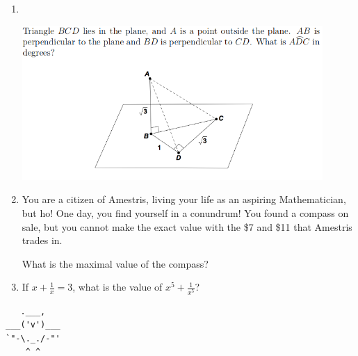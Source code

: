 \documentclass{article}
\begin{document}
\begin{enumerate}[1.]
\item %
~
\begin{center}
    \includegraphics[width=0.9\textwidth]{test_1_question_3}
\end{center}
\vspace{6.81mm}

\item %
You are a citizen of Amestris, living your life as an aspiring Mathematician, but ho! One day, you find yourself in a conundrum! You found a compass on sale, but you cannot make the exact value with the \$7 and \$11 that Amestris trades in. 

What is the maximal value of the compass?
\vspace{6.81mm}

\item %
If $x + \frac{1}{x} = 3$, what is the value of $x^5 + \frac{1}{x^5}$?\\

\end{enumerate}


\vfill
\begin{center} \begin{BVerbatim}
   .___,   
___('v')___
`"-\._./-"'
    ^ ^ 

\end{BVerbatim} \end{center}
\end{document}
